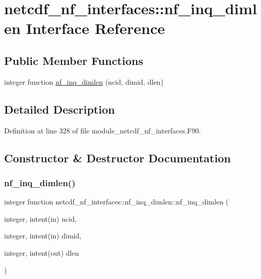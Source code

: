 \hypertarget{interfacenetcdf__nf__interfaces_1_1nf__inq__dimlen}{}\section{netcdf\+\_\+nf\+\_\+interfaces\+:\+:nf\+\_\+inq\+\_\+dimlen Interface Reference}
\label{interfacenetcdf__nf__interfaces_1_1nf__inq__dimlen}
\subsection*{Public Member Functions}
\begin{DoxyCompactItemize}
\item 
integer function \hyperlink{interfacenetcdf__nf__interfaces_1_1nf__inq__dimlen_ab85b7b1ee9d0b966d703ff61fc9b1b41}{nf\+\_\+inq\+\_\+dimlen} (ncid, dimid, dlen)
\end{DoxyCompactItemize}


\subsection{Detailed Description}


Definition at line 328 of file module\+\_\+netcdf\+\_\+nf\+\_\+interfaces.\+F90.



\subsection{Constructor \& Destructor Documentation}
\mbox{\label{interfacenetcdf__nf__interfaces_1_1nf__inq__dimlen_ab85b7b1ee9d0b966d703ff61fc9b1b41}} 
\subsubsection{\texorpdfstring{nf\+\_\+inq\+\_\+dimlen()}{nf\_inq\_dimlen()}}
{\footnotesize\ttfamily integer function netcdf\+\_\+nf\+\_\+interfaces\+::nf\+\_\+inq\+\_\+dimlen\+::nf\+\_\+inq\+\_\+dimlen (\begin{DoxyParamCaption}\item[{integer, intent(in)}]{ncid,  }\item[{integer, intent(in)}]{dimid,  }\item[{integer, intent(out)}]{dlen }\end{DoxyParamCaption})}



